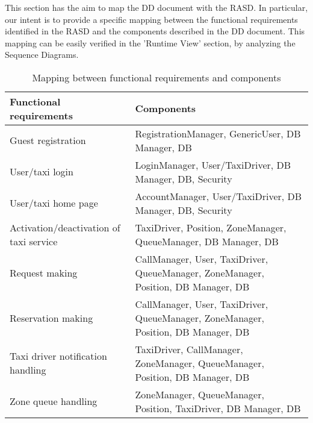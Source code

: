 This section has the aim to map the DD document with the RASD.
\newline
In particular, our intent is to provide a specific mapping between the functional requirements identified in the RASD and the components described in the DD document. This mapping can be easily verified in the 'Runtime View' section, by analyzing the Sequence Diagrams.

\begin{table}[h]
\begin{center}
    \begin{tabular}{|l|p{}|}
        \hline
        {\bf Functional requirements}  & {\bf Components}\\
        \hline
        Guest registration & RegistrationManager, GenericUser, DB Manager, DB\\
        \hline
        User/taxi login & LoginManager, User/TaxiDriver, DB Manager, DB, Security\\
        \hline
        User/taxi home page & AccountManager, User/TaxiDriver, DB Manager, DB, Security\\
        \hline
        Activation/deactivation of taxi service & TaxiDriver, Position, ZoneManager, QueueManager, DB Manager, DB\\
        \hline
        Request making & CallManager, User, TaxiDriver, QueueManager, ZoneManager, Position, DB Manager, DB\\
        \hline
        Reservation making & CallManager, User, TaxiDriver, QueueManager, ZoneManager, Position, DB Manager, DB\\
        \hline
        Taxi driver notification handling & TaxiDriver, CallManager, ZoneManager, QueueManager, Position, DB Manager, DB\\
        \hline
        Zone queue handling & ZoneManager, QueueManager, Position, TaxiDriver, DB Manager, DB \\
        \hline
    \end{tabular}
    \caption{Mapping between functional requirements and components}
\end{center}
\end{table}